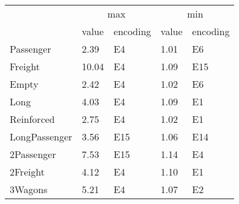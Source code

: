 \begin{tabular}{lllll}
\toprule
 & \multicolumn{2}{c}{max} & \multicolumn{2}{c}{min} \\
 & value & encoding & value & encoding \\
\midrule
Passenger & 2.39 & E4 & 1.01 & E6 \\
Freight & 10.04 & E4 & 1.09 & E15 \\
Empty & 2.42 & E4 & 1.02 & E6 \\
Long & 4.03 & E4 & 1.09 & E1 \\
Reinforced & 2.75 & E4 & 1.02 & E1 \\
LongPassenger & 3.56 & E15 & 1.06 & E14 \\
2Passenger & 7.53 & E15 & 1.14 & E4 \\
2Freight & 4.12 & E4 & 1.10 & E1 \\
3Wagons & 5.21 & E4 & 1.07 & E2 \\
\bottomrule
\end{tabular}
